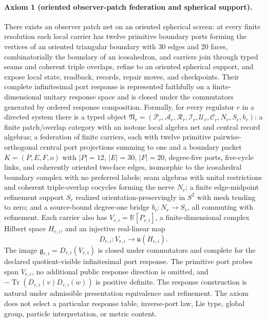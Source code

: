 
\paragraph{Axiom 1 (oriented observer-patch federation and spherical support).}
There exists an observer patch net on an oriented spherical screen: at every
finite resolution each local carrier has twelve primitive boundary ports
forming the vertices of an oriented triangular boundary with 30 edges and 20
faces, combinatorially the boundary of an icosahedron, and carriers join
through typed seams and coherent triple overlaps, refine to an oriented
spherical support, and expose local state, readback, records, repair moves,
and checkpoints. Their complete infinitesimal port response is represented
faithfully on a finite-dimensional unitary response space and is closed under
the commutators generated by ordered response composition. Formally, for
every regulator \(r\) in a
directed system there is a typed object
\(\mathfrak N_r=(\mathcal P_r,\mathcal A_r,\mathcal R_r,\mathcal I_r,
\mathcal U_r,\mathcal C_r,N_r,S_r,b_r)\):
a finite patch/overlap category with an isotone local algebra net and
central record algebras; a federation of finite carriers, each with twelve
primitive pairwise-orthogonal central port projections summing to one and a
boundary packet \(K=(P,E,F,o)\) with \(|P|=12\), \(|E|=30\), \(|F|=20\),
degree-five ports, five-cycle links, and coherently oriented two-face edges,
isomorphic to the icosahedral boundary complex with no preferred labels;
seam algebras with unital restrictions and coherent triple-overlap cocycles
forming the nerve \(N_r\); a finite edge-midpoint refinement support
\(S_r\) realized orientation-preservingly in \(S^2\) with mesh tending to
zero; and a source-bound degree-one bridge \(b_r:N_r\to S_r\), all commuting
with refinement. Each carrier also has
\(V_{r,i}=\mathbb R[P_{r,i}]\), a finite-dimensional complex Hilbert space
\(H_{r,i}\), and an injective real-linear map
\[
D_{r,i}:V_{r,i}\longrightarrow\mathfrak u(H_{r,i}).
\]
The image \(\mathfrak g_{r,i}=D_{r,i}(V_{r,i})\) is closed under
commutators and complete for the declared quotient-visible infinitesimal
port response. The primitive port probes span \(V_{r,i}\), no additional
public response direction is omitted, and
\(-\operatorname{Tr}(D_{r,i}(v)D_{r,i}(w))\) is positive definite. The
response construction is natural under admissible presentation equivalence
and refinement. The axiom does not select a particular response table,
inverse-port law, Lie type, global group, particle interpretation, or metric
content.

